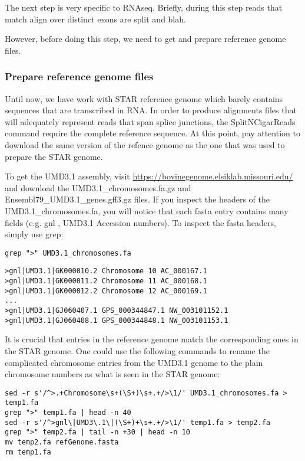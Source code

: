 The next step is very specific to RNAseq. Briefly, during this step reads that match align over distinct exons are split and blah.

However, before doing this step, we need to get and prepare reference genome files.

\subsubsection{Prepare reference genome files}

Until now, we have work with STAR reference genome which barely contains sequences that are transcribed in RNA. In order to produce alignments files that will adequately represent reads that span splice junctions, the SplitNCigarReads command require the complete reference sequence. At this point, pay attention to download the same version of the refence genome as the one that was used to prepare the STAR genome.

To get the UMD3.1 assembly, visit \href{https://bovinegenome.elsiklab.missouri.edu/}{https://bovinegenome.elsiklab.missouri.edu/} and download the UMD3.1\_chromosomes.fa.gz and Ensembl79\_UMD3.1\_genes.gff3.gz files. If you inspect the headers of the UMD3.1\_chromosomes.fa, you will notice that each fasta entry contains many fields (e.g. gnl , UMD3.1 Accession numbers). To inspect the fasta headers, simply use grep:

\begin{verbatim}
grep ">" UMD3.1_chromosomes.fa
\end{verbatim}


\begin{verbatim}
>gnl|UMD3.1|GK000010.2 Chromosome 10 AC_000167.1
>gnl|UMD3.1|GK000011.2 Chromosome 11 AC_000168.1
>gnl|UMD3.1|GK000012.2 Chromosome 12 AC_000169.1
...
>gnl|UMD3.1|GJ060407.1 GPS_000344847.1 NW_003101152.1
>gnl|UMD3.1|GJ060408.1 GPS_000344848.1 NW_003101153.1
\end{verbatim}


It is crucial that entries in the reference genome match the corresponding ones in the STAR genome. One could use the following commands to rename the complicated chromosome entries from the UMD3.1 genome to the plain chromosome numbers as what is seen in the STAR genome:

\begin{verbatim}
sed -r s'/^>.+Chromosome\s+(\S+)\s+.+/>\1/' UMD3.1_chromosomes.fa > temp1.fa
grep ">" temp1.fa | head -n 40
sed -r s'/^>gnl\|UMD3\.1\|(\S+)+\s+.+/>\1/' temp1.fa > temp2.fa
grep ">" temp2.fa | tail -n +30 | head -n 10
mv temp2.fa refGenome.fasta
rm temp1.fa
\end{verbatim}


